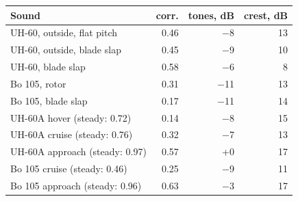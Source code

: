 \begin{tabular}{@{}lrrr@{}}
\toprule
Sound & corr. & tones, dB & crest, dB \\
\midrule
UH-60, outside, flat pitch & 0.46 & $-$8 & 13 \\
UH-60, outside, blade slap & 0.45 & $-$9 & 10 \\
UH-60, blade slap & 0.58 & $-$6 & 8 \\
Bo 105, rotor & 0.31 & $-$11 & 13 \\
Bo 105, blade slap & 0.17 & $-$11 & 14 \\
UH-60A hover (steady: 0.72) & 0.14 & $-$8 & 15 \\
UH-60A cruise (steady: 0.76) & 0.32 & $-$7 & 13 \\
UH-60A approach (steady: 0.97) & 0.57 & +0 & 17 \\
Bo 105 cruise (steady: 0.46) & 0.25 & $-$9 & 11 \\
Bo 105 approach (steady: 0.96) & 0.63 & $-$3 & 17 \\
\bottomrule
\end{tabular}
